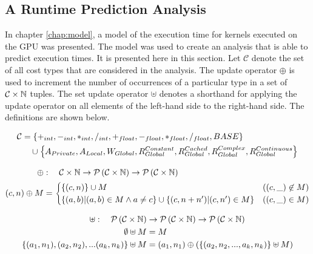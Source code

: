 \subsection{A Runtime Prediction Analysis}
\label{sect:results_results_analysis} 
In chapter \ref{chap:model}, a model of the execution time for kernels executed on the GPU was presented. The model was used to create an analysis that is able to predict execution times. It is presented here in this section. Let $\mathcal{C}$ denote the set of all cost types that are considered in the analysis. The update operator $\oplus$ is used to increment the number of occurrences of a particular type in a set of $\mathcal{C}\times\mathbb{N}$ tuples. The set update operator $\uplus$ denotes a shorthand for applying the update operator on all elements of the left-hand side to the right-hand side. The definitions are shown below. 


\begin{align}
    \label{eq:results_results_analysis_costset}
	\mathcal{C} &= \left\{ +_{int}, -_{int}, *_{int}, /_{int}, +_{float}, -_{float}, *_{float}, /_{float}, BASE \right\}\\
                    &\quad \cup \left\{ A_{Private}, A_{Local}, W_{Global}, R_{Global}^{Constant}, R_{Global}^{Cached}, R_{Global}^{Complex}, R_{Global}^{Continuous} \right\}\notag 
\end{align}

\begin{align}
    \label{eq:results_results_analysis_update}
    \oplus  &:\quad   \mathcal{C} \times \mathbb{N} \rightarrow \mathcal{P}\left(\mathcal{C} \times \mathbb{N}\right) \rightarrow \mathcal{P}\left(\mathcal{C} \times \mathbb{N}\right) \\
    (c, n) \oplus M &=      
        \begin{cases}
            \left\{ (c,n) \right\} \cup M & ((c,\_) \not\in M) \\
            \left\{ (a,b)| (a,b) \in M \wedge a \not= c \right\} \cup \left\{ (c, n+n') | (c,n') \in M \right\} & ((c,\_) \in M)
        \end{cases} \notag
\end{align}

\begin{align}
    \label{eq:results_results_analysis_setupdate}
    \uplus  :\quad \mathcal{P}\left(\mathcal{C} \times \mathbb{N}\right) &\rightarrow \mathcal{P}\left(\mathcal{C} \times \mathbb{N}\right) \rightarrow \mathcal{P}\left(\mathcal{C} \times \mathbb{N}\right) \\
    \emptyset \uplus M &= M \notag\\
    \left\{ (a_1,n_1), (a_2, n_2), ... (a_k, n_k) \right\} \uplus M &= (a_1,n_1) \oplus (\left\{ (a_2, n_2, ..., a_k, n_k) \right\} \uplus M) \notag
\end{align}

